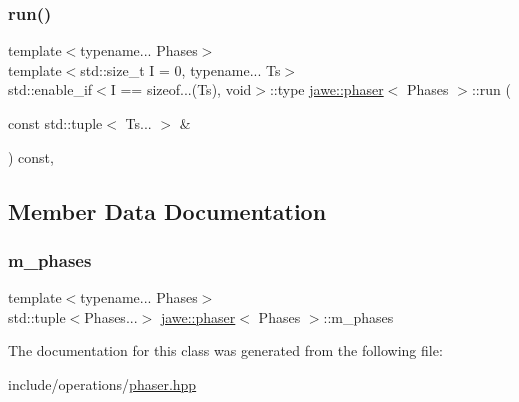 \mbox{\label{classjawe_1_1phaser_ab2331ed2fd0c314d637520d1679bd7f7}} 
\subsubsection{\texorpdfstring{run()}{run()}\hspace{0.1cm}{\footnotesize\ttfamily [2/2]}}
{\footnotesize\ttfamily template$<$typename... Phases$>$ \\
template$<$std\+::size\+\_\+t I = 0, typename... Ts$>$ \\
std\+::enable\+\_\+if$<$I == sizeof...(Ts), void$>$\+::type \hyperlink{classjawe_1_1phaser}{jawe\+::phaser}$<$ Phases $>$\+::run (\begin{DoxyParamCaption}\item[{const std\+::tuple$<$ Ts... $>$ \&}]{ }\end{DoxyParamCaption}) const\hspace{0.3cm}{\ttfamily [inline]}, {\ttfamily [private]}}



\subsection{Member Data Documentation}
\mbox{\label{classjawe_1_1phaser_a14a41750a367d5ca484d1d3b6498c163}} 
\subsubsection{\texorpdfstring{m\+\_\+phases}{m\_phases}}
{\footnotesize\ttfamily template$<$typename... Phases$>$ \\
std\+::tuple$<$Phases...$>$ \hyperlink{classjawe_1_1phaser}{jawe\+::phaser}$<$ Phases $>$\+::m\+\_\+phases\hspace{0.3cm}{\ttfamily [private]}}



The documentation for this class was generated from the following file\+:\begin{DoxyCompactItemize}
\item 
include/operations/\hyperlink{phaser_8hpp}{phaser.\+hpp}\end{DoxyCompactItemize}
